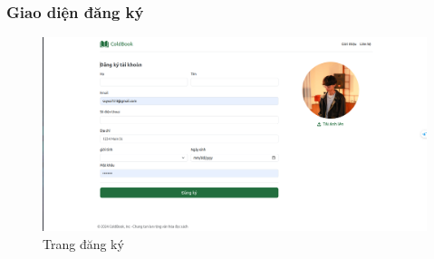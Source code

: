 \subsubsection{Giao diện đăng ký}
\begin{figure}[H]
  \centering
  \includegraphics[width=1\textwidth]{report/images/client/c_dangky.png}
  \caption{Trang đăng ký}
\end{figure}